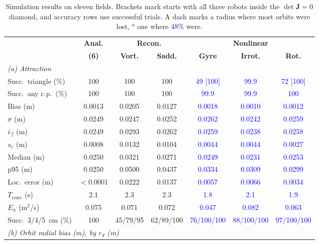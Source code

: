 \documentclass[lettersize,journal]{IEEEtran}
\newcommand{\rev}[1]{#1}
\newcommand{\newnum}[1]{\textcolor{blue}{#1}}
\begin{document}
\begin{table}[!t]
\scriptsize
\centering
\caption{Simulation results on eleven fields. Brackets mark starts with all three robots inside the $\det\mathbf{J} = 0$ diamond, and accuracy rows use successful trials. A dash marks a radius where most orbits were lost, $^{a}$ one where \newnum{48}\% were.}
\label{tab:simulation_results}
\setlength{\tabcolsep}{1.3pt}
\rev{\begin{tabular}{l|c|cc|ccc}
\hline
 & \textbf{Anal.} & \multicolumn{2}{c|}{\textbf{Recon.}} & \multicolumn{3}{c}{\textbf{Nonlinear}} \\
 & \textbf{(6)} & \textbf{Vort.} & \textbf{Sadd.} & \textbf{Gyre} & \textbf{Irrot.} & \textbf{Rot.} \\
\hline
\multicolumn{7}{l}{\textit{(a) Attraction}} \\
\hline
Succ.\ triangle (\%) & 100 & 100 & 100 & \newnum{49 [100]} & \newnum{99.9} & \newnum{72 [100]} \\
Succ.\ any c.p.\ (\%) & 100 & 100 & 100 & \newnum{99.9} & \newnum{99.9} & \newnum{100} \\
Bias (m) & 0.0013 & 0.0205 & 0.0127 & \newnum{0.0018} & \newnum{0.0010} & \newnum{0.0012} \\
$\sigma$ (m) & 0.0249 & 0.0247 & 0.0252 & \newnum{0.0262} & \newnum{0.0242} & \newnum{0.0259} \\
$\bar{e}_f$ (m) & 0.0249 & 0.0293 & 0.0262 & \newnum{0.0259} & \newnum{0.0238} & \newnum{0.0258} \\
$s_e$ (m) & 0.0008 & 0.0132 & 0.0104 & \newnum{0.0044} & \newnum{0.0044} & \newnum{0.0027} \\
Median (m) & 0.0250 & 0.0321 & 0.0271 & \newnum{0.0249} & \newnum{0.0231} & \newnum{0.0253} \\
p95 (m) & 0.0250 & 0.0500 & 0.0437 & \newnum{0.0334} & \newnum{0.0309} & \newnum{0.0299} \\
Loc.\ error (m) & $<$0.0001 & 0.0222 & 0.0137 & \newnum{0.0057} & \newnum{0.0066} & \newnum{0.0034} \\
$T_{\mathrm{conv}}$ (s) & 2.1 & 2.3 & 2.3 & \newnum{1.8} & \newnum{2.1} & \newnum{1.9} \\
$E_u$ (m$^2$/s) & 0.075 & 0.071 & 0.072 & \newnum{0.047} & \newnum{0.082} & \newnum{0.063} \\
Succ.\ 3/4/5~cm (\%) & 100 & 45/79/95 & 62/89/100 & \newnum{76/100/100} & \newnum{88/100/100} & \newnum{97/100/100} \\
\hline
\multicolumn{7}{l}{\textit{(b) Orbit radial bias (m), by $r_d$ (m)}} \\

\end{tabular}}
\end{table}
\end{document}
